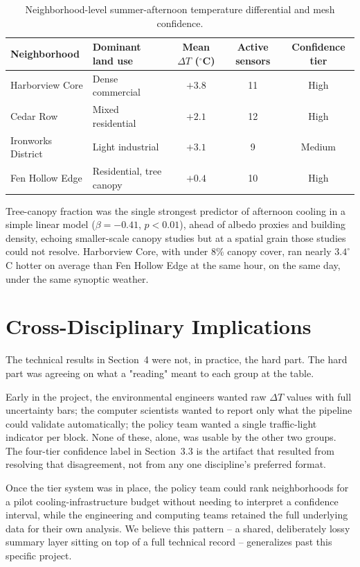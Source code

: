 \documentclass[10pt,twocolumn]{article}
\begin{document}
\begin{table}[t]
\centering
\caption{Neighborhood-level summer-afternoon temperature differential and mesh confidence.}
\label{tab:results}
\begin{tabularx}{\textwidth}{X l c c c}
\toprule
\textbf{Neighborhood} & \textbf{Dominant land use} & \textbf{Mean $\Delta T$ ($^\circ$C)} & \textbf{Active sensors} & \textbf{Confidence tier} \\
\midrule
\rowcolor{mist} Harborview Core & Dense commercial & $+3.8$ & 11 & High \\
Cedar Row & Mixed residential & $+2.1$ & 12 & High \\
\rowcolor{mist} Ironworks District & Light industrial & $+3.1$ & 9 & Medium \\
Fen Hollow Edge & Residential, tree canopy & $+0.4$ & 10 & High \\
\bottomrule
\end{tabularx}
\end{table}

Tree-canopy fraction was the single strongest predictor of afternoon cooling in a simple linear
model ($\beta = -0.41$, $p < 0.01$), ahead of albedo proxies and building density, echoing
smaller-scale canopy studies but at a spatial grain those studies could not resolve. Harborview
Core, with under 8\% canopy cover, ran nearly $3.4^\circ$C hotter on average than Fen Hollow Edge
at the same hour, on the same day, under the same synoptic weather.

\section{Cross-Disciplinary Implications}
The technical results in Section~4 were not, in practice, the hard part. The hard part was
agreeing on what a "reading" meant to each group at the table.

\begin{notebox}
Early in the project, the environmental engineers wanted raw $\Delta T$ values with full
uncertainty bars; the computer scientists wanted to report only what the pipeline could
validate automatically; the policy team wanted a single traffic-light indicator per block.
None of these, alone, was usable by the other two groups. The four-tier confidence label in
Section~3.3 is the artifact that resulted from resolving that disagreement, not from any one
discipline's preferred format.
\end{notebox}

Once the tier system was in place, the policy team could rank neighborhoods for a pilot
cooling-infrastructure budget without needing to interpret a confidence interval, while the
engineering and computing teams retained the full underlying data for their own analysis. We
believe this pattern -- a shared, deliberately lossy summary layer sitting on top of a full
technical record -- generalizes past this specific project.
\end{document}
